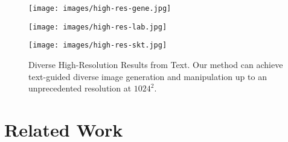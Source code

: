 \documentclass[final]{cvpr}
\begin{document}
\begin{figure*}[th]
\centering
\begin{minipage}[t]{0.33\textwidth}
\centering
\texttt{[image: images/high-res-gene.jpg]}\\
\vspace{-5.0pt}\fontsize{7.0pt}{\baselineskip}
\end{minipage}
\begin{minipage}[t]{0.33\textwidth}
\centering
\texttt{[image: images/high-res-lab.jpg]}\\ 
\vspace{-5.0pt}\fontsize{7.0pt}{\baselineskip}
\end{minipage}
\begin{minipage}[t]{0.33\textwidth}
\centering
\texttt{[image: images/high-res-skt.jpg]}\\
\vspace{-5.0pt}\fontsize{7.0pt}{\baselineskip}
\end{minipage}
\caption{Diverse High-Resolution Results from Text. 
Our method can achieve text-guided diverse image generation and manipulation up to an unprecedented resolution at $\text{1024}^2$.}
\label{fig:high-res-gene}
\end{figure*}


\section{Related Work}
\label{sec:related_work}
\end{document}
